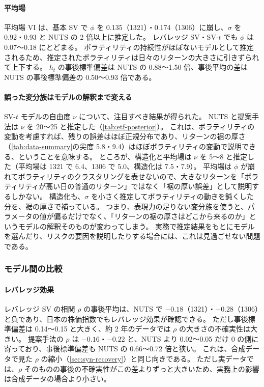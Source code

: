 \paragraph{平均場}
平均場 VI は、基本 SV で $\phi$ を 0.135（1321）・0.174（1306）に崩し、$\sigma$ を 0.92・0.93 と NUTS の 2 倍以上に推定した。
レバレッジ SV・SV-$t$ でも $\phi$ は 0.07〜0.18 にとどまる。
ボラティリティの持続性がほぼないモデルとして推定されるため、推定されたボラティリティは日々のリターンの大きさに引きずられて上下する。
$h_t$ の事後標準偏差は NUTS の 0.88〜1.50 倍、事後平均の差は NUTS の事後標準偏差の 0.50〜0.93 倍である。

\paragraph{誤った変分族はモデルの解釈まで変える}
SV-$t$ モデルの自由度 $\nu$ について、注目すべき結果が得られた。
NUTS と提案手法は $\nu$ を 20〜25 と推定した（\cref{tab:etf-posterior}）。
これは、ボラティリティの変動を考慮すれば、残りの誤差はほぼ正規分布であり、リターンの裾の厚さ（\cref{tab:data-summary}の尖度 5.8・9.4）はほぼボラティリティの変動で説明できる、ということを意味する。
ところが、構造化と平均場は $\nu$ を 5〜8 と推定した（平均場は 1321 で 6.4、1306 で 5.0、構造化は 7.5・7.9）。
平均場は $\phi$ が崩れてボラティリティのクラスタリングを表せないので、大きなリターンを「ボラティリティが高い日の普通のリターン」ではなく「裾の厚い誤差」として説明するしかない。
構造化も、$\sigma$ を小さく推定してボラティリティの動きを鈍くした分を、裾の厚さで補っている。
つまり、表現力の足りない変分族を使うと、パラメータの値が偏るだけでなく、「リターンの裾の厚さはどこから来るのか」というモデルの解釈そのものが変わってしまう。
実務で推定結果をもとにモデルを選んだり、リスクの要因を説明したりする場合には、これは見過ごせない問題である。

\subsubsection{モデル間の比較}

\paragraph{レバレッジ効果}
レバレッジ SV の相関 $\rho$ の事後平均は、NUTS で $-0.18$（1321）・$-0.28$（1306）と負であり、日本の株価指数でもレバレッジ効果が確認できる。
ただし事後標準偏差は 0.14〜0.15 と大きく、約 2 年のデータでは $\rho$ の大きさの不確実性は大きい。
提案手法の $\rho$ は $-0.16$・$-0.22$ と、NUTS より 0.02〜0.05 だけ 0 の側に寄っており、事後標準偏差も NUTS の 0.66〜0.72 倍と狭い。
これは、合成データで見た $\rho$ の縮小（\cref{sec:syn-recovery}）と同じ向きである。
ただし実データでは、$\rho$ そのものの事後の不確実性がこの差よりずっと大きいため、実務上の影響は合成データの場合より小さい。

